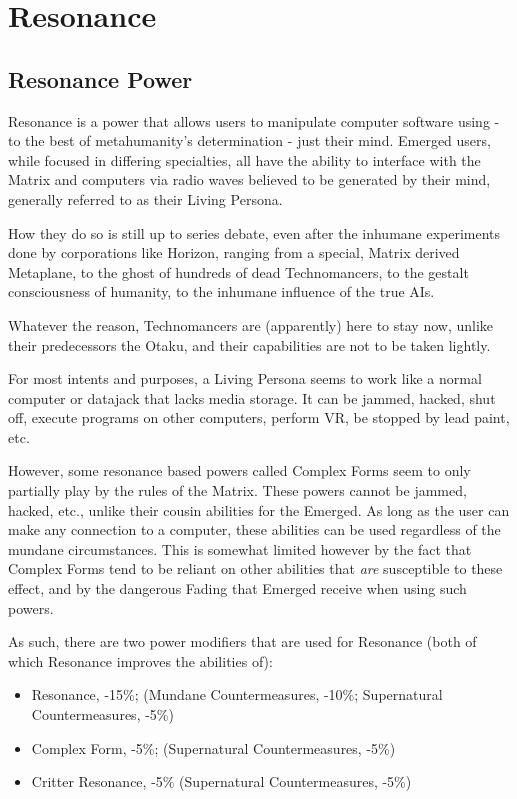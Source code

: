 \section{Resonance}

\begin{multicols*}{3}
	
	\subsection{Resonance Power}
	
	Resonance is a power that allows users to manipulate computer software using - to the best of metahumanity's determination - just their mind. Emerged users, while focused in differing specialties, all have the ability to interface with the Matrix and computers via radio waves believed to be generated by their mind, generally referred to as their Living Persona.
	
	How they do so is still up to series debate, even after the inhumane experiments done by corporations like Horizon, ranging from a special, Matrix derived Metaplane, to the ghost of hundreds of dead Technomancers, to the gestalt consciousness of humanity, to the inhumane influence of the true AIs.
	
	Whatever the reason, Technomancers are (apparently) here to stay now, unlike their predecessors the Otaku, and their capabilities are not to be taken lightly.
	
	For most intents and purposes, a Living Persona seems to work like a normal computer or datajack that lacks media storage. It can be jammed, hacked, shut off, execute programs on other computers, perform VR, be stopped by lead paint, etc. 
	
	However, some resonance based powers called Complex Forms seem to only partially play by the rules of the Matrix. These powers cannot be jammed, hacked, etc., unlike their cousin abilities for the Emerged. As long as the user can make any connection to a computer, these abilities can be used regardless of the mundane circumstances. This is somewhat limited however by the fact that Complex Forms tend to be reliant on other abilities that \textit{are} susceptible to these effect, and by the dangerous Fading that Emerged receive when using such powers.
	
	As such, there are two power modifiers that are used for Resonance (both of which Resonance improves the abilities of):
	
	\begin{itemize}
		\item Resonance, -15\%; (Mundane Countermeasures, -10\%; Supernatural Countermeasures, -5\%)
		\item Complex Form, -5\%; (Supernatural Countermeasures, -5\%)
		\item Critter Resonance, -5\% (Supernatural Countermeasures, -5\%)
	\end{itemize}
	

\end{multicols*}
